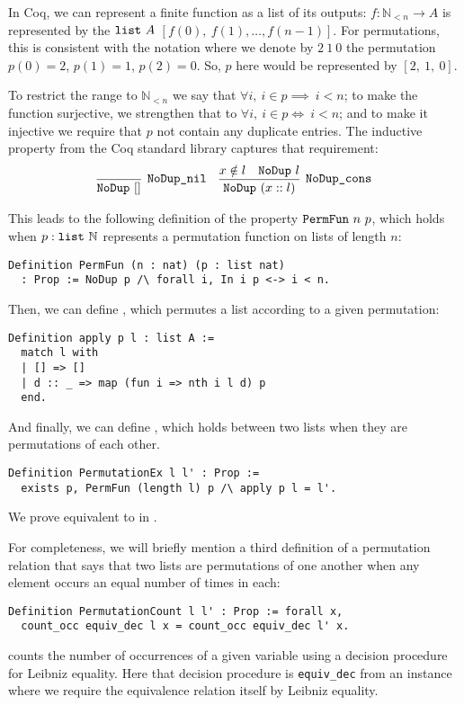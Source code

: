 \documentclass[sigplan,10pt,anonymous,review]{thesis}
\begin{document}
In Coq, we can represent a finite function as a list of its outputs:
$f : \mathbb{N}_{<n} \to A$ is represented by the $\texttt{\textup{list}}~A$
$[f(0),~f(1),\allowbreak\ldots,f(n-1)]$. For permutations, this is consistent with the
notation where we denote by $2~1~0$ the permutation $p(0) = 2$, $p(1)
= 1$, $p(2) = 0$. So, $p$ here would be represented by $[2,~1,~0]$.

To restrict the range to $\mathbb{N}_{<n}$ we say that $\forall i,~i \in p
\implies ~i<n$; to make the function surjective, we strengthen that to
$\forall i,~i \in p \iff ~i<n$; and to make it injective we require that $p$ not
contain any duplicate entries. The inductive property  from
the Coq standard library captures that requirement:
\begin{align*}
  \infer[\var{NoDup\_nil}]{\var{NoDup}~[]}{}
  &&
  \infer[\var{NoDup\_cons}]{\var{NoDup}~(x :: l)}{%
    x \notin l & \var{NoDup}~l
  }
\end{align*}

This leads to the following definition of the property
$\texttt{\textup{PermFun}}~n~p$, which holds when $p : \texttt{\textup{list}}~\mathbb{N}$
represents a permutation function on lists of length $n$:
\begin{lstlisting}
Definition PermFun (n : nat) (p : list nat)
  : Prop := NoDup p /\ forall i, In i p <-> i < n.
\end{lstlisting}
Then, we can define , which permutes a list according to a
given permutation:
\begin{lstlisting}
Definition apply p l : list A :=
  match l with
  | [] => []
  | d :: _ => map (fun i => nth i l d) p
  end.
\end{lstlisting}
And finally, we can define , which holds between
two lists when they are permutations of each other.
\begin{lstlisting}
Definition PermutationEx l l' : Prop :=
  exists p, PermFun (length l) p /\ apply p l = l'.
\end{lstlisting}
We prove  equivalent to  in
.

For completeness, we will briefly mention a third definition of a
permutation relation that says that two lists are permutations of one
another when any element occurs an equal number of times in each:
\begin{lstlisting}
Definition PermutationCount l l' : Prop := forall x,
  count_occ equiv_dec l x = count_occ equiv_dec l' x.
\end{lstlisting}
 counts the number of occurrences of a given variable
using a decision procedure for Leibniz equality. Here that decision
procedure is \texttt{equiv\_dec} from an  instance where we
require the equivalence relation itself by Leibniz equality.
\end{document}
